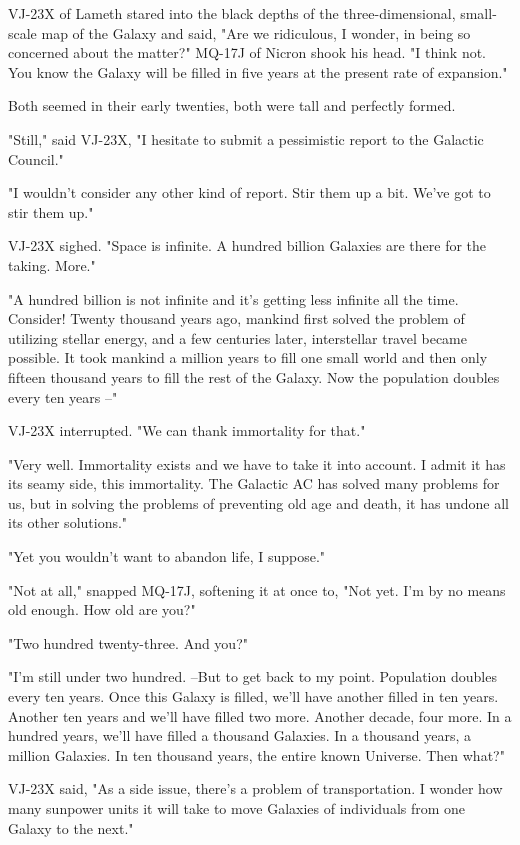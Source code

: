 \documentclass[11pt,twocolumn,paper=a5,pagesize]{article}
\newcommand{\futuretwo}[1]{ #1 }
\begin{document}
\futuretwo{
VJ-23X of Lameth stared into the black depths of the three-dimensional, small-scale map of the Galaxy and said, "Are we ridiculous, I wonder, in being so concerned about the matter?"
MQ-17J of Nicron shook his head. "I think not. You know the Galaxy will be filled in five years at the present rate of expansion."

Both seemed in their early twenties, both were tall and perfectly formed.

"Still," said VJ-23X, "I hesitate to submit a pessimistic report to the Galactic Council."

"I wouldn't consider any other kind of report. Stir them up a bit. We've got to stir them up."

VJ-23X sighed. "Space is infinite. A hundred billion Galaxies are there for the taking. More."

"A hundred billion is not infinite and it's getting less infinite all the time. Consider! Twenty thousand years ago, mankind first solved the problem of utilizing stellar energy, and a few centuries later, interstellar travel became possible. It took mankind a million years to fill one small world and then only fifteen thousand years to fill the rest of the Galaxy. Now the population doubles every ten years --"

VJ-23X interrupted. "We can thank immortality for that."

"Very well. Immortality exists and we have to take it into account. I admit it has its seamy side, this immortality. The Galactic AC has solved many problems for us, but in solving the problems of preventing old age and death, it has undone all its other solutions."

"Yet you wouldn't want to abandon life, I suppose."

"Not at all," snapped MQ-17J, softening it at once to, "Not yet. I'm by no means old enough. How old are you?"

"Two hundred twenty-three. And you?"

"I'm still under two hundred. --But to get back to my point. Population doubles every ten years. Once this Galaxy is filled, we'll have another filled in ten years. Another ten years and we'll have filled two more. Another decade, four more. In a hundred years, we'll have filled a thousand Galaxies. In a thousand years, a million Galaxies. In ten thousand years, the entire known Universe. Then what?"

VJ-23X said, "As a side issue, there's a problem of transportation. I wonder how many sunpower units it will take to move Galaxies of individuals from one Galaxy to the next."

}
\end{document}
